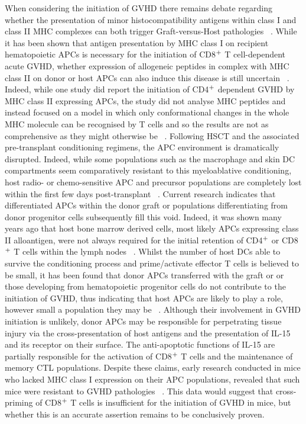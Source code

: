 When considering the initiation of GVHD there remains debate regarding whether the presentation of minor histocompatibility antigens within class I and class II MHC complexes can both trigger Graft-versus-Host pathologies ~\autocite{Tou2012}. While it has been shown that antigen presentation by MHC class I on recipient hematopoietic APCs is necessary for the initiation of CD8$\textsuperscript{+}$ T cell-dependent acute GVHD, whether expression of allogeneic peptides in complex with MHC class II on donor or host APCs can also induce this disease is still uncertain ~\autocite{Koy2012}. Indeed, while one study did report the initiation of CD4$\textsuperscript{+}$ dependent GVHD by MHC class II expressing APCs, the study did not analyse MHC peptides and instead focused on a model in which only conformational changes in the whole MHC molecule can be recognised by T cells and so the results are not as comprehensive as they might otherwise be ~\autocite{Koy2012,Tes2002}. Following HSCT and the associated pre-transplant conditioning regimens, the APC environment is dramatically disrupted. Indeed, while some populations such as the macrophage and skin DC compartments seem comparatively resistant to this myeloablative conditioning, host radio- or chemo-sensitive APC and precursor populations are completely lost within the first few days post-transplant ~\autocite{Cha2007}. Current research indicates that differentiated APCs within the donor graft or populations differentiating from donor progenitor cells subsequently fill this void. Indeed, it was shown many years ago that host bone marrow derived cells, most likely APCs expressing class II alloantigen, were not always required for the initial retention of CD4$\textsuperscript{+}$ or CD8$\textsuperscript{+}$ T cells within the lymph nodes ~\autocite{Kos1993}. Whilst the number of host DCs able to survive the conditioning process and prime/activate effector T cells is believed to be small, it has been found that donor APCs transferred with the graft or or those developing from hematopoietic progenitor cells do not contribute to the initiation of GVHD, thus indicating that host APCs are likely to play a role, however small a population they may be ~\autocite{Cha2007}. Although their involvement in GVHD initiation is unlikely, donor APCs may be responsible for perpetrating tissue injury via the cross-presentation of host antigens and the presentation of IL-15 and its receptor on their surface. The anti-apoptotic functions of IL-15 are partially responsible for the activation of CD8$\textsuperscript{+}$ T cells and the maintenance of memory CTL populations. Despite these claims, early research conducted in mice who lacked MHC class I expression on their APC populations, revealed that such mice were resistant to GVHD pathologies ~\autocite{Shi1999}. This data would suggest that cross-priming of CD8$\textsuperscript{+}$ T cells is insufficient for the initiation of GVHD in mice, but whether this is an accurate assertion remains to be conclusively proven.

